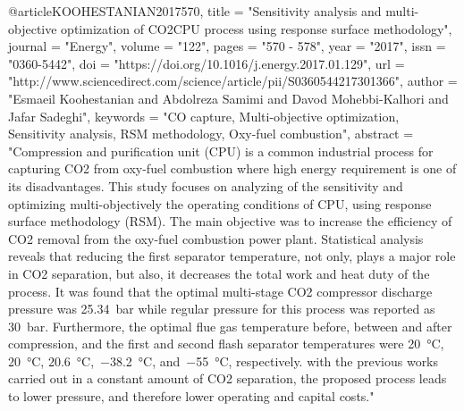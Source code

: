 @article{KOOHESTANIAN2017570,
	title = "Sensitivity analysis and multi-objective optimization of CO2CPU process using response surface methodology",
	journal = "Energy",
	volume = "122",
	pages = "570 - 578",
	year = "2017",
	issn = "0360-5442",
	doi = "https://doi.org/10.1016/j.energy.2017.01.129",
	url = "http://www.sciencedirect.com/science/article/pii/S0360544217301366",
	author = "Esmaeil Koohestanian and Abdolreza Samimi and Davod Mohebbi-Kalhori and Jafar Sadeghi",
	keywords = "CO capture, Multi-objective optimization, Sensitivity analysis, RSM methodology, Oxy-fuel combustion",
	abstract = "Compression and purification unit (CPU) is a common industrial process for capturing CO2 from oxy-fuel combustion where high energy requirement is one of its disadvantages. This study focuses on analyzing of the sensitivity and optimizing multi-objectively the operating conditions of CPU, using response surface methodology (RSM). The main objective was to increase the efficiency of CO2 removal from the oxy-fuel combustion power plant. Statistical analysis reveals that reducing the first separator temperature, not only, plays a major role in CO2 separation, but also, it decreases the total work and heat duty of the process. It was found that the optimal multi-stage CO2 compressor discharge pressure was 25.34 bar while regular pressure for this process was reported as 30 bar. Furthermore, the optimal flue gas temperature before, between and after compression, and the first and second flash separator temperatures were 20 °C, 20 °C, 20.6 °C, −38.2 °C, and −55 °C, respectively. with the previous works carried out in a constant amount of CO2 separation, the proposed process leads to lower pressure, and therefore lower operating and capital costs."
}

